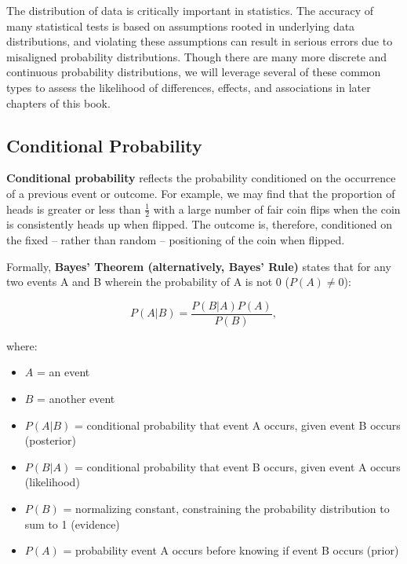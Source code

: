 \documentclass[]{book}
\providecommand{\tightlist}{%
  \setlength{\itemsep}{0pt}\setlength{\parskip}{0pt}}
\begin{document}
The distribution of data is critically important in statistics. The accuracy of many statistical tests is based on assumptions rooted in underlying data distributions, and violating these assumptions can result in serious errors due to misaligned probability distributions. Though there are many more discrete and continuous probability distributions, we will leverage several of these common types to assess the likelihood of differences, effects, and associations in later chapters of this book.

\hypertarget{conditional-probability}{%
\subsection{Conditional Probability}\label{conditional-probability}}

\textbf{Conditional probability} reflects the probability conditioned on the occurrence of a previous event or outcome. For example, we may find that the proportion of heads is greater or less than \(\frac{1}{2}\) with a large number of fair coin flips when the coin is consistently heads up when flipped. The outcome is, therefore, conditioned on the fixed -- rather than random -- positioning of the coin when flipped.

Formally, \textbf{Bayes' Theorem (alternatively, Bayes' Rule)} states that for any two events A and B wherein the probability of A is not 0 (\(P(A) \neq 0\)):

\[ P(A \vert B) = \frac{P(B \vert A) P(A)}{P(B)}, \]

where:

\begin{itemize}
\tightlist
\item
  \(A\) = an event
\item
  \(B\) = another event
\item
  \(P(A|B)\) = conditional probability that event A occurs, given event B occurs (posterior)
\item
  \(P(B|A)\) = conditional probability that event B occurs, given event A occurs (likelihood)
\item
  \(P(B)\) = normalizing constant, constraining the probability distribution to sum to 1 (evidence)
\item
  \(P(A)\) = probability event A occurs before knowing if event B occurs (prior)
\end{itemize}
\end{document}
